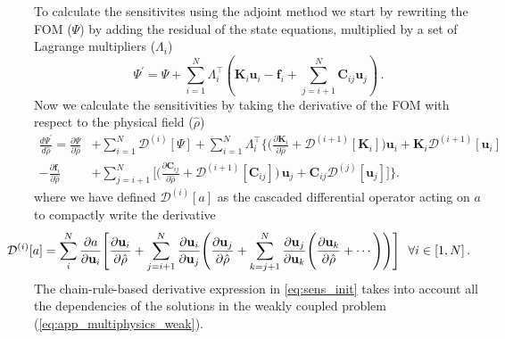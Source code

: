 To calculate the sensitivites using the adjoint method we start by rewriting the FOM ($\Psi$) by adding the residual
of the state equations, multiplied by a set of Lagrange multipliers ($\Lambda_i$)
\begin{equation}\label{eq:adj_init}
    \Psi^\prime =\Psi + \sum^N_{i=1} \Lambda_{i}^{\top}\left(\mathbf{K}_i \mathbf{u}_i -\mathbf{f}_i + \sum^N_{j=i+1} \mathbf{C}_{ij} \mathbf{u}_j \right)\,.
\end{equation}
Now we calculate the sensitivities by taking the derivative of the FOM with respect to the physical field ($\hat{\rho}$)
\begin{align}\label{eq:sens_init}
    \frac{d \Psi^\prime}{d \hat{\rho}} 
    = \frac{\partial \Psi}{\partial \hat{\rho}} 
    &+ \sum_{i=1}^N \mathcal{D}^{(i)}[\Psi]
    + \sum_{i=1}^N \Lambda_i^\top \Bigg\{\Bigg(
        \frac{\partial \mathbf{K}_i}{\partial \hat{\rho}} 
        + \mathcal{D}^{(i+1)}[\mathbf{K}_i]\Bigg) \mathbf{u}_i 
        + \mathbf{K}_i \mathcal{D}^{(i+1)}[\mathbf{u}_i] \nonumber \\
        - \frac{\partial \mathbf{f}_i}{\partial \hat{\rho}} 
        &+ \sum_{j=i+1}^{N} \Bigg[ \Bigg(
            \frac{\partial \mathbf{C}_{ij}}{\partial \hat{\rho}} + 
            \mathcal{D}^{(i+1)}[\mathbf{C}_{ij}] \Bigg)\, \mathbf{u}_j 
            + \mathbf{C}_{ij} \mathcal{D}^{(j)}[\mathbf{u}_j] 
        \Bigg]
    \Bigg\}. 
\end{align}
where we have defined $\mathcal{D}^{(i)}[a]$ as the cascaded differential operator acting on $a$ to compactly write the derivative
\begin{align}
    \hspace*{-0.775cm}\mathcal{D}^{(i)}[a] &= \sum^N_{i} \frac{\partial a}{\partial \mathbf{u}_i} \Bigg[ \frac{\partial \mathbf{u}_i}{\partial \hat{\rho}} + 
    \sum_{j=i+1}^{N} \frac{\partial \mathbf{u}_i}{\partial \mathbf{u}_j} \Bigg( \frac{\partial \mathbf{u}_j}{\partial \hat{\rho}} + 
    \sum_{k=j+1}^{N} \frac{\partial \mathbf{u}_j}{\partial \mathbf{u}_k} \Bigg( \frac{\partial \mathbf{u}_k}{\partial \hat{\rho}} + \cdots \Bigg) \Bigg) \Bigg] \,\,\,\, \forall i \in [1, N] \,.
\end{align}
The chain-rule-based derivative expression in \eqref{eq:sens_init} takes into account all the dependencies of the solutions in the weakly coupled problem (\eqref{eq:app_multiphysics_weak}).

